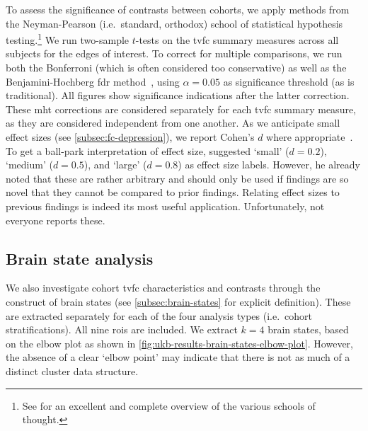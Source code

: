 To assess the significance of contrasts between cohorts, we apply methods from the Neyman-Pearson (i.e.~standard, orthodox) school of statistical hypothesis testing.\footnote{See \textcite{Dienes2008} for an excellent and complete overview of the various schools of thought.}
%
We run two-sample $t$-tests on the \gls{tvfc} summary measures across all subjects for the edges of interest.
To correct for multiple comparisons, we run both the Bonferroni (which is often considered too conservative) as well as the Benjamini-Hochberg \gls{fdr} method~\parencite{Benjamini1995}, using $\alpha = 0.05$ as significance threshold (as is traditional).
All figures show significance indications after the latter correction.
These \gls{mht} corrections are considered separately for each \gls{tvfc} summary measure, as they are considered independent from one another.
%
As we anticipate small effect sizes (see \cref{subsec:fc-depression}), we report Cohen's $d$ where appropriate~\parencite{Cohen1988, Lakens2013}.
To get a ball-park interpretation of effect size, \textcite{Cohen1988} suggested `small' ($d = 0.2$), `medium' ($d = 0.5$), and `large' ($d = 0.8$) as effect size labels.
However, he already noted that these are rather arbitrary and should only be used if findings are so novel that they cannot be compared to prior findings.
Relating effect sizes to previous findings is indeed its most useful application.
Unfortunately, not everyone reports these.

\subsection{Brain state analysis}

We also investigate cohort \gls{tvfc} characteristics and contrasts through the construct of brain states (see \cref{subsec:brain-states} for explicit definition).
These are extracted separately for each of the four analysis types (i.e.~cohort stratifications).
All nine \glspl{roi} are included.
%
We extract $k = 4$ brain states, based on the elbow plot as shown in \cref{fig:ukb-results-brain-states-elbow-plot}.
However, the absence of a clear `elbow point' may indicate that there is not as much of a distinct cluster data structure.


